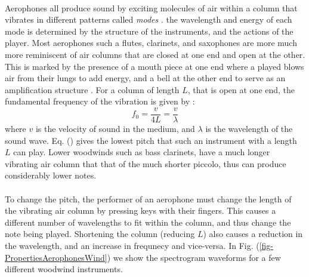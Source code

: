 \documentclass[12pt,letterpaper]{article}
\begin{document}
\paragraph*{}Aerophones all produce sound by exciting molecules of air within a column that vibrates in different patterns called \textit{modes} \cite{White}. the wavelength and energy of each mode is  determined by the structure of the instruments, and the actions of the player. Most aerophones such a flutes, clarinets, and saxophones are more much more reminiscent of air columns that are closed at one end and open at the other. This is marked by the presence of a mouth piece at one end where a played blows air from their lungs to add energy, and a bell at the other end to serve as an amplification structure \cite{Olson}. For a column of length $L$, that is open at one end, the fundamental frequency of the vibration is given by \cite{Olson}:
\begin{equation}
\label{eqn-OpenClosedCol}
f_0 = \frac{v}{4L} = \frac{v}{\lambda}
\end{equation}
where $v$ is the velocity of sound in the medium, and $\lambda$ is the wavelength of the sound wave. Eq. (\cite{eqn-OpenClosedCol}) gives the lowest pitch that such an instrument with a length $L$ can play. Lower woodwinds such as bass clarinets, have a much longer vibrating air column that that of the much shorter piccolo, thus can produce considerably lower notes.

\paragraph*{}To change the pitch, the performer of an aerophone must change the length of the vibrating air column by pressing keys with their fingers. This causes a different number of wavelengths to fit within the column, and thus change the note being played. Shortening the column (reducing $L$) also causes a reduction in the wavelength, and an increase in frequnecy and vice-versa. In Fig. (\ref{fig-PropertiesAerophonesWind}) we show the spectrogram waveforms for a few different woodwind instruments.
\end{document}
